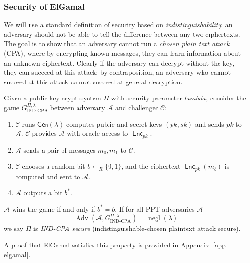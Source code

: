 \documentclass[12pt,a4paper]{article}
\DeclareMathOperator{\negl}{\text{negl}}
\DeclareMathOperator{\Adv}{\text{Adv}}
\DeclareMathOperator{\Enc}{\mathsf{Enc}}
\theoremstyle{definition}
\begin{document}
\subsubsection{Security of ElGamal}
We will use a standard definition of security based on \textit{indistinguishability}: an adversary should not be able to tell the difference between any two ciphertexts. The goal is to show that an adversary cannot run a \textit{chosen plain text attack} (CPA), where by encrypting known messages, they can learn information about an unknown ciphertext. Clearly if the adversary can decrypt without the key, they can succeed at this attack; by contraposition, an adversary who cannot succeed at this attack cannot succeed at general decryption.

\begin{definition}
    Given a public key cryptosystem $\Pi$ with security parameter $lambda$, consider the game $G_{\text{IND-CPA}}^{\Pi,\lambda}$ between adversary $\mathcal{A}$ and challenger $\mathcal{C}$:
    \begin{enumerate}
        \item $\mathcal{C}$ runs $\mathsf{Gen}(\lambda)$ computes public and secret keys $(pk, sk)$ and sends $pk$ to $\mathcal{A}$. $\mathcal{C}$ provides $\mathcal{A}$ with oracle access to $\Enc_{pk}$.
        \item $\mathcal{A}$ sends a pair of messages $m_0, m_1$ to $\mathcal{C}$.
        \item $\mathcal{C}$ chooses a random bit $b\gets_R\{0, 1\}$, and the ciphertext $\Enc_{pk}(m_b)$ is computed and sent to $\mathcal{A}$.
        \item $\mathcal{A}$ outputs a bit $b^*$.
    \end{enumerate}
    $\mathcal{A}$ wins  the game if and only if $b^*=b$. If for all PPT adversaries $\mathcal{A}$
    $$\Adv\left(\mathcal{A},G^{\Pi,\lambda}_{\text{IND-CPA}}\right)=\negl(\lambda)$$
    we say $\Pi$ is \textit{IND-CPA secure} (indistinguishable-chosen plaintext attack secure).
\end{definition}
A proof that ElGamal satisfies this property is provided in Appendix~\ref{app-elgamal}.
\end{document}
